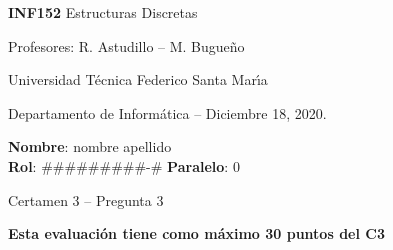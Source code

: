 \documentclass[letterpaper,10pt]{article}
\begin{document}
\thispagestyle{empty}

\begin{minipage}[t]{0.6\textwidth}

{\LARGE \textbf{INF152} Estructuras Discretas}

{\large Profesores: R. Astudillo -- M. Bugueño}

Universidad T\'ecnica Federico Santa Mar\'{\i}a

Departamento de Inform\'atica -- Diciembre 18, 2020.

\end{minipage}
\hfill
\begin{minipage}[t]{0.35\textwidth}
\textbf{Nombre}: nombre apellido\\[0.3cm]
\textbf{Rol}: #########-# \textbf{Paralelo}: 0
\end{minipage}

\vspace{0.8cm}

{\Large Certamen 3 -- Pregunta 3}

\vspace{0.4cm}

\textbf{Esta evaluación tiene como máximo 30 puntos del C3}
\end{document}
